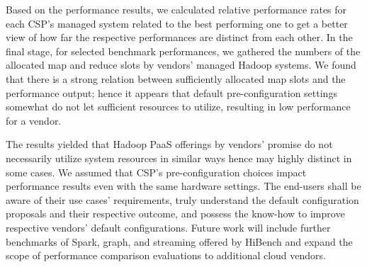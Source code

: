 \documentclass[review]{elsarticle}
\begin{document}
	Based on the performance results, we calculated relative performance rates for each CSP's managed system related to the best performing one to get a better view of how far the respective performances are distinct from each other. In the final stage, for selected benchmark performances, we gathered the numbers of the allocated map and reduce slots by vendors' managed Hadoop systems. We found that there is a strong relation between sufficiently allocated map slots and the performance output; hence it appears that default pre-configuration settings somewhat do not let sufficient resources to utilize, resulting in low performance for a vendor.
	
	The results yielded that Hadoop PaaS offerings by vendors' promise do not necessarily utilize system resources in similar ways hence may highly distinct in some cases. We assumed that CSP's pre-configuration choices impact performance results even with the same hardware settings. The end-users shall be aware of their use cases' requirements, truly understand the default configuration proposals and their respective outcome, and possess the know-how to improve respective vendors' default configurations. %
	Future work will include further benchmarks of Spark, graph, and streaming offered by HiBench and expand the scope of performance comparison evaluations to additional cloud vendors. %
	
	
	
\end{document}
